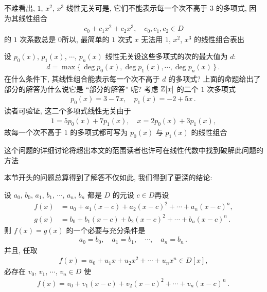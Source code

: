 \begin{remark}
    不难看出, $1$, $x^2$, $x^3$ 线性无关\period 可是, 它们不能表示每一个次不高于 $3$ 的多项式, 因为其线性组合
    \begin{align*}
        c_0 + c_1 x^2 + c_2 x^3, \quad c_0, c_1, c_2 \in D
    \end{align*}
    的 $1$ 次系数总是 $0$\period 所以, 最简单的 $1$ 次式 $x$ 无法用 $1$, $x^2$, $x^3$ 的线性组合表出\period

    设 $p_0 (x)$, $p_1 (x)$, $\cdots$, $p_n (x)$ 线性无关\period 设这些多项式的次的最大值为 $d$:
    \begin{align*}
        d = \max \{\, \deg p_0 (x), \deg p_1 (x), \cdots, \deg p_n (x) \,\} \period
    \end{align*}
    在什么条件下, 其线性组合能表示每一个次不高于 $d$ 的多项式? 上面的命题给出了部分的解答\period 为什么说它是 ``部分的解答'' 呢? 考虑 $\mathbb{Z}[x]$ 的二个 $1$ 次多项式
    \begin{align*}
        p_0 (x) = 3 - 7x, \quad p_1 (x) = -2 + 5x \period
    \end{align*}
    读者可验证, 这二个多项式线性无关\period 由于
    \begin{align*}
        1 = 5p_0 (x) + 7p_1 (x), \quad x = 2p_0 (x) + 3p_1 (x),
    \end{align*}
    故每一个次不高于 $1$ 的多项式都可写为 $p_0 (x)$ 与 $p_1 (x)$ 的线性组合\period

    这个问题的详细讨论将超出本文的范围\period 读者也许可在线性代数中找到破解此问题的方法\period
\end{remark}

本节开头的问题总算得到了解答\period 不仅如此, 我们得到了更深的结论:

\begin{proposition}
    设 $a_0$, $b_0$, $a_1$, $b_1$, $\cdots$, $a_n$, $b_n$ 都是 $D$ 的元\period 设 $c \in D$\period 再设
    \begin{align*}
        f(x) & = a_0 + a_1 (x - c) + a_2 (x - c)^2 + \cdots + a_n (x - c)^n,        \\
        g(x) & = b_0 + b_1 (x - c) + b_2 (x - c)^2 + \cdots + b_n (x - c)^n \period
    \end{align*}
    则 $f(x)=g(x)$ 的一个必要与充分条件是
    \begin{align*}
        a_0 = b_0, \quad a_1 = b_1, \quad \cdots, \quad a_n = b_n \period
    \end{align*}
    并且, 任取
    \begin{align*}
        f(x) = u_0 + u_1 x + u_2 x^2 + \cdots + u_n x^n \in D[x],
    \end{align*}
    必存在 $v_0$, $v_1$, $\cdots$, $v_n \in D$ 使
    \begin{align*}
        f(x) = v_0 + v_1 (x - c) + v_2 (x - c)^2 + \cdots + v_n (x - c)^n \period
    \end{align*}
\end{proposition}
